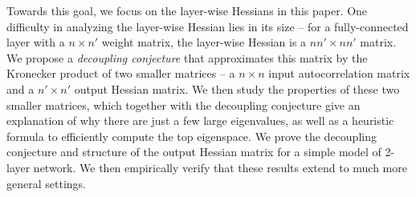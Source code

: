 Towards this goal, we focus on the layer-wise Hessians in this paper. One difficulty in analyzing the layer-wise Hessian lies in its size \--- for a fully-connected layer with a $n\times n'$ weight matrix, the layer-wise Hessian is a $nn'\times nn'$ matrix. We propose a {\em decoupling conjecture} that approximates this matrix by the Kronecker product of two smaller matrices \--- a $n\times n$ input autocorrelation matrix and a $n'\times n'$ output Hessian matrix. We then study the properties of these two smaller matrices, which together with the decoupling conjecture give an explanation of why there are just a few large eigenvalues, as well as a heuristic formula to efficiently compute the top eigenspace. We prove the decoupling conjecture and structure of the output Hessian matrix for a simple model of 2-layer network. We then empirically verify that these results extend to much more general settings.







